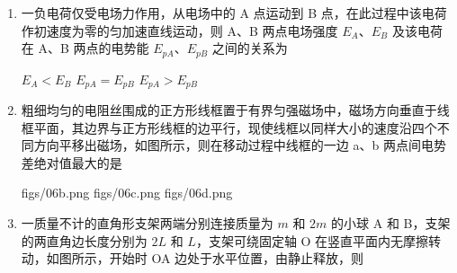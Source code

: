 \documentclass[\gkver]{gaokaozhenti}
\begin{document}
\begin{enumerate}
{$\Delta v=12\Ums$}
{$W=0$}
{$W=10.8\UJ$}


\item
一负电荷仅受电场力作用，从电场中的 A 点运动到 B 点，在此过程中该电荷作初速度为零的匀加速直线运动，则 A、B 两点电场强度 $E_{A}$、$E_{B}$ 及该电荷在 A、B 两点的电势能 $E_{pA}$、$E_{pB}$ 之间的关系为

{$E_{A}<E_{B}$}
{$E_{pA}=E_{pB}$}
{$E_{pA}>E_{pB}$}


\item
粗细均匀的电阻丝围成的正方形线框置于有界匀强磁场中，磁场方向垂直于线框平面，其边界与正方形线框的边平行，现使线框以同样大小的速度沿四个不同方向平移出磁场，如图所示，则在移动过程中线框的一边 a、b 两点间电势差绝对值最大的是

{figs/06b.png}
{figs/06c.png}
{figs/06d.png}


\item
一质量不计的直角形支架两端分别连接质量为 $m$ 和 $2m$ 的小球 A 和 B，支架的两直角边长度分别为 $2L$ 和 $L$，支架可绕固定轴 O 在竖直平面内无摩擦转动，如图所示，开始时 OA 边处于水平位置，由静止释放，则


\end{enumerate}
\end{document}
